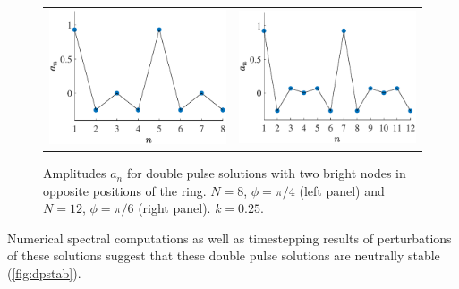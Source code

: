 \documentclass[12pt,reqno]{amsart}
\begin{document}
\begin{figure}[H]
\begin{center}
\begin{tabular}{cc}
\includegraphics[width=7.5cm]{images/dp8pi4} &
\includegraphics[width=7.5cm]{images/dp12pi6}
\end{tabular}
\end{center}
\caption{Amplitudes $a_n$ for double pulse solutions with two bright nodes in opposite positions of the ring. $N=8$, $\phi=\pi/4$ (left panel) and $N=12$, $\phi=\pi/6$ (right panel). $k=0.25$.}
\label{fig:dp}
\end{figure}

Numerical spectral computations as well as timestepping results of perturbations of these solutions suggest that these double pulse solutions are neutrally stable (\cref{fig:dpstab}).
\end{document}
